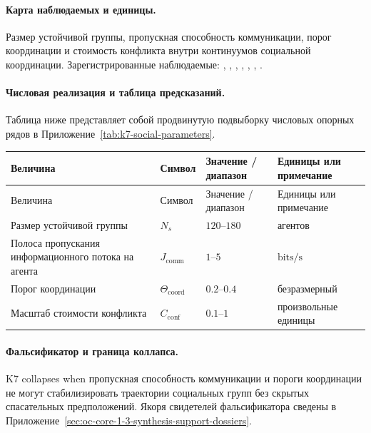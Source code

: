 \paragraph{Карта наблюдаемых и единицы.}
Размер устойчивой группы, пропускная способность коммуникации, порог координации и стоимость конфликта внутри континуумов социальной координации.
Зарегистрированные наблюдаемые: , \allowbreak {}, \allowbreak {}, \allowbreak {}, \allowbreak {}, \allowbreak {}, \allowbreak {}.

\paragraph{Числовая реализация и таблица предсказаний.}
Таблица ниже представляет собой продвинутую подвыборку числовых опорных рядов в Приложение~\ref{tab:k7-social-parameters}.
\begin{longtable}{@{}L{0.27\textwidth}L{0.15\textwidth}L{0.24\textwidth}L{0.16\textwidth}@{}}
\toprule
Величина & Символ & Значение / диапазон & Единицы или примечание \\
\midrule
\endfirsthead
\toprule
Величина & Символ & Значение / диапазон & Единицы или примечание \\
\midrule
\endhead
Размер устойчивой группы & $\scriptstyle N_s$ & $120\text{--}180$ & агентов \\
Полоса пропускания информационного потока на агента & $\scriptstyle J_{\mathrm{comm}}$ & $1\text{--}5$ & $\mathrm{bits/s}$ \\
Порог координации & $\scriptstyle \Theta_{\mathrm{coord}}$ & $0.2\text{--}0.4$ & безразмерный \\
Масштаб стоимости конфликта & $\scriptstyle C_{\mathrm{conf}}$ & $0.1\text{--}1$ & произвольные единицы \\
\bottomrule
\end{longtable}

\paragraph{Фальсификатор и граница коллапса.}
K7 collapses when пропускная способность коммуникации и пороги координации не могут стабилизировать траектории социальных групп без скрытых спасательных предположений.
Якоря свидетелей фальсификатора сведены в Приложение~\ref{sec:oc-core-1-3-synthesis-support-dossiers}.

